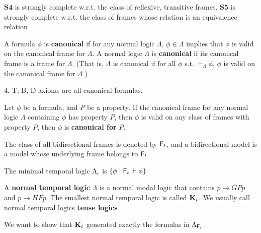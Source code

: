 \documentclass[11pt]{article}
\begin{document}
\begin{theorem}[]
\(\textbf{S4}\) is strongly complete w.r.t. the class of reflexive, transitive
frames. \(\textbf{S5}\) is strongly complete w.r.t. the class of frames whose
relation is an equivalence relation
\end{theorem}


\begin{definition}[Canonicity]
A formula \(\phi\) is \textbf{canonical} if for any normal logic \(\Lambda\), \(\phi\in\Lambda\)
implies that \(\phi\) is valid on the canonical frame for \(\Lambda\). A normal logic \(\Lambda\) is
\textbf{canonical} if its canonical frame is a frame for \(\Lambda\). (That is,
\(\Lambda\) is canonical if for all \(\phi\) s.t. \(\vdash_{\Lambda}\phi\), \(\phi\) is valid on the
canonical frame for \(\Lambda\) ) 
\end{definition}

4, T, B, D axioms are all canonical formulas.

\begin{definition}
Let \(\phi\) be a formula, and \(P\) be a property. If the canonical frame for any
normal logic \(\Lambda\) containing \(\phi\) has property \(P\), then \(\phi\) is valid on any class
of frames with property \(P\), then \(\phi\) is \textbf{canonical for} \(P\).
\end{definition}

The class of all bidirectional frames is denoted by \(\textsf{F}_t\), and a
bidirectional model is a model whose underlying frame belongs to \(\textsf{F}_t\)

\begin{definition}[]
The minimal temporal logic \(\Lambda_{\sf_t}\) is \(\{\phi\mid \textsf{F}_t\Vdash\phi\}\)
\end{definition}



\begin{definition}[]
A \textbf{normal temporal logic} \(\Lambda\) is a normal modal logic that contains \(p\to
   GPp\) and \(p\to HF p\). The smallest normal temporal logic is called
\(\operatorname{\textbf{K}}_t\). We usually call normal temporal logics \textbf{tense logics}
\end{definition}

We want to show that \(\operatorname{\textbf{K}}_t\) generated exactly the formulas in
\(\Lambda_{\textsf{F}_t}\).
\end{document}
